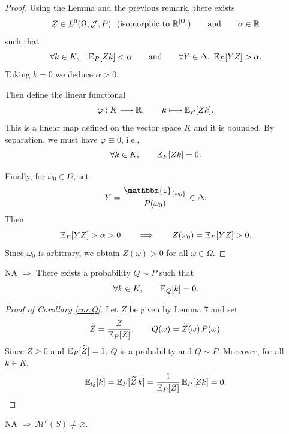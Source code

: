 \begin{proof}
Using the Lemma and the previous remark, there exists
\[
 Z\in L^0(\Omega,\mathcal{J},P)\ \ (\text{isomorphic to } \RR^{|\Omega|})
 \qquad\text{and}\qquad
 \alpha\in\RR
\]
such that
\[
\forall k\in K,\quad \mathbb{E}_P[Zk]<\alpha
\qquad\text{and}\qquad
\forall Y\in\Delta,\ \mathbb{E}_P[YZ]>\alpha .
\]
Taking $k=0$ we deduce $\alpha>0$.

Then define the linear functional
\[
\varphi:K\longrightarrow\mathbb{R},\qquad
k\longmapsto \mathbb{E}_P[Zk] .
\]
This is a linear map defined on the vector space $K$ and it is bounded.
By separation, we must have $\varphi\equiv 0$, i.e.,
\[
\forall k\in K,\qquad \mathbb{E}_P[Zk]=0.
\]

Finally, for $\omega_0\in\Omega$, set
\[
Y=\frac{\mathbbm{1}_{\{\omega_0\}}}{P(\omega_0)}\in\Delta.
\]
Then
\[
\mathbb{E}_P[YZ]>\alpha>0
\qquad\Longrightarrow\qquad
Z(\omega_0)=\mathbb{E}_P[YZ]>0 .
\]
Since $\omega_0$ is arbitrary, we obtain $Z(\omega)>0$ for all $\omega\in\Omega$.
\end{proof}

\begin{corollary}\label{cor:Q}
NA $\Rightarrow$ There exists a probability $Q\sim P$ such that
\[
\forall k\in K,\qquad \mathbb{E}_Q[k]=0 .
\]
\end{corollary}

\begin{proof}[Proof of Corollary \ref{cor:Q}]
Let $Z$ be given by Lemma 7 and set
\[
\widetilde Z=\frac{Z}{\mathbb{E}_P[Z]},
\qquad
Q(\omega)=\widetilde Z(\omega)\,P(\omega).
\]
Since $Z\ge0$ and $\mathbb{E}_P[\widetilde Z]=1$, $Q$ is a probability and $Q\sim P$.
Moreover, for all $k\in K$,
\[
\mathbb{E}_Q[k]=\mathbb{E}_P[\widetilde Z\,k]
=\frac{1}{\mathbb{E}_P[Z]}\,\mathbb{E}_P[Zk]=0 .
\]
\end{proof}

\begin{lemma}\label{lem:8}
NA $\Rightarrow\ \mathcal{M}^e(S)\neq\varnothing$. 
\end{lemma}

